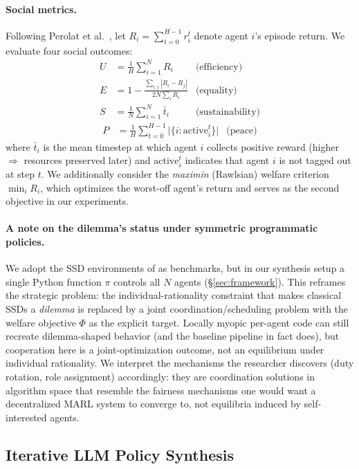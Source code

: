 \documentclass{article}
\begin{document}
\paragraph{Social metrics.} Following Perolat et al.~\cite{perolat2017}, let $R_i = \sum_{t=0}^{H-1} r_i^t$ denote agent $i$'s episode return. We evaluate four social outcomes:
\begin{align*}
U &= \tfrac{1}{H}\sum_{i=1}^{N} R_i & \text{(efficiency)} \\
E &= 1 - \frac{\sum_{i,j} |R_i - R_j|}{2N \sum_i R_i} & \text{(equality)} \\
S &= \tfrac{1}{N}\sum_{i=1}^{N} \bar t_i & \text{(sustainability)} 
\end{align*}
\begin{align*}
P &= \tfrac{1}{H}\sum_{t=0}^{H-1} \big|\{i : \textrm{active}_i^t\}\big| & \text{(peace)}
\end{align*}
where $\bar t_i$ is the mean timestep at which agent $i$ collects positive reward (higher $\Rightarrow$ resources preserved later) and $\textrm{active}_i^t$ indicates that agent $i$ is not tagged out at step $t$. We additionally consider the \emph{maximin} (Rawlsian) welfare criterion $\min_i R_i$, which optimizes the worst-off agent's return and serves as the second objective in our experiments.

\paragraph{A note on the dilemma's status under symmetric programmatic policies.}
We adopt the SSD environments of \cite{leibo2017,hughes2018,perolat2017} as benchmarks, but in our synthesis setup a single Python function $\pi$ controls all $N$ agents (\S\ref{sec:framework}). This reframes the strategic problem: the individual-rationality constraint that makes classical SSDs a \emph{dilemma} is replaced by a joint coordination/scheduling problem with the welfare objective $\Phi$ as the explicit target. Locally myopic per-agent code can still recreate dilemma-shaped behavior (and the baseline pipeline in fact does), but cooperation here is a joint-optimization outcome, not an equilibrium under individual rationality. We interpret the mechanisms the researcher discovers (duty rotation, role assignment) accordingly: they are coordination solutions in algorithm space that resemble the fairness mechanisms one would want a decentralized MARL system to converge to, not equilibria induced by self-interested agents.

\subsection{Iterative LLM Policy Synthesis}
\end{document}
